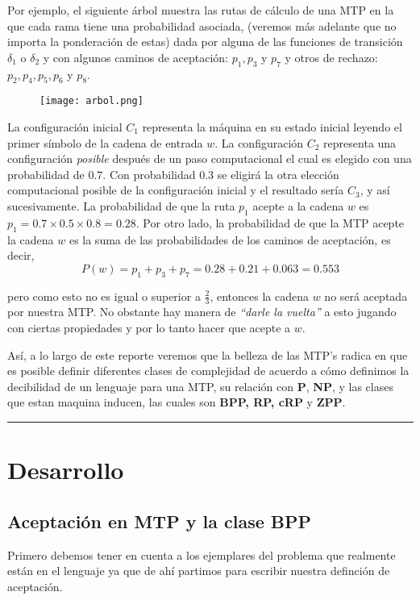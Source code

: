 \documentclass[12pt,letterpaper]{article}
\newcommand{\lineaxd}{{\color{brown}\rule{\linewidth}{0.5mm}}}
\begin{document}
Por ejemplo, el siguiente árbol muestra las rutas de cálculo de una MTP en la que cada rama tiene una probabilidad 
asociada, (veremos más adelante que no importa la ponderación de estas) dada por alguna de las funciones de transición $\delta_1$ o $\delta_2$ y con 
algunos caminos de aceptación: $p_1, p_3$ y $p_7$ y otros de rechazo: $p_2, p_4, p_5, 
p_6$ y $p_8$.
\begin{figure}[htb]
        \centering
        \texttt{[image: arbol.png]}
\end{figure}  
\newpage
La configuración inicial $C_1$ representa la máquina en su estado inicial 
leyendo el primer símbolo de la cadena de entrada $w$. La configuración $C_2$ representa 
una configuración \textit{posible} después de un paso computacional el cual es elegido con una 
probabilidad de $0.7$. Con probabilidad $0.3$ se eligirá la otra elección computacional 
posible de la configuración inicial y el resultado sería $C_3$, y así sucesivamente. 
La probabilidad de que la ruta $p_1$ acepte a la cadena $w$ es $p_1 = 0.7 \times 0.5
\times 0.8 = 0.28$. Por otro lado, la probabilidad de que la MTP acepte la cadena 
$w$ es la suma de las probabilidades de los caminos de aceptación, es decir, 
\begin{equation*}
    P(w) = p_1 + p_3 + p_7 = 0.28+0.21+0.063 = 0.553
\end{equation*}

pero como esto no es igual o superior a $\frac{2}{3}$, entonces la cadena $w$ no será 
aceptada por nuestra MTP. No obstante hay manera de \textit{``darle la vuelta''} a esto jugando con ciertas propiedades y por lo tanto hacer que acepte a $w$.

Así, a lo largo de este reporte veremos que la belleza de las MTP's radica en que es posible
definir diferentes clases de complejidad de acuerdo a cómo definimos la decibilidad de 
un lenguaje para una MTP, su relación con \textbf{P}, \textbf{NP}, y las clases que estan maquina inducen, las cuales son \textbf{BPP, RP, cRP} y \textbf{ZPP}. 

\lineaxd
\section*{Desarrollo}
\subsection*{Aceptación en MTP y la clase BPP}
Primero debemos tener en cuenta a los ejemplares del problema que realmente están en el lenguaje ya que de ahí partimos para escribir nuestra definción de aceptación.
\end{document}
